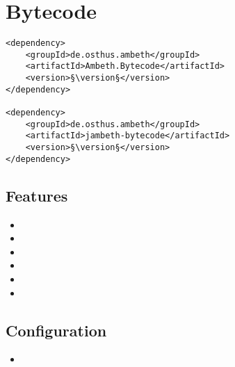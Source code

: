 \section{Bytecode}
\label{module:Bytecode}
\ClearAPI
\TODO
\begin{lstlisting}[style=POM,caption={Maven modules to use \emph{Ambeth Bytecode}}]
<dependency>
	<groupId>de.osthus.ambeth</groupId>
	<artifactId>Ambeth.Bytecode</artifactId>
	<version>§\version§</version>
</dependency>

<dependency>
	<groupId>de.osthus.ambeth</groupId>
	<artifactId>jambeth-bytecode</artifactId>
	<version>§\version§</version>
</dependency>
\end{lstlisting}
\subsection{Features}
\begin{itemize}
	\item {}
	\item {}
	\item {}
	\item {}
	\item {}
	\item {}
\end{itemize}

\subsection{Configuration}
\begin{itemize}
	\item {}
\end{itemize}

